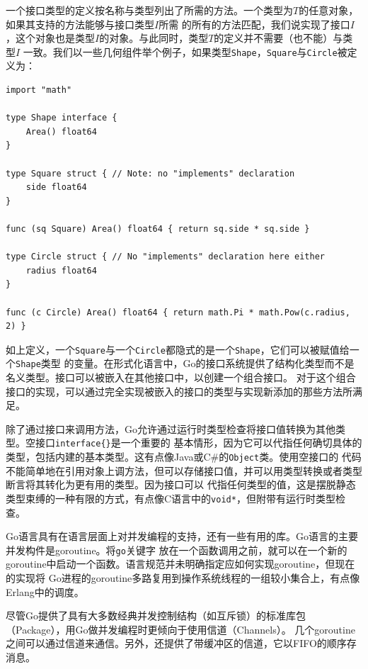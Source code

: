 \documentclass[12pt]{article}
\begin{document}
\indent{}一个接口类型的定义按名称与类型列出了所需的方法。一个类型为$T$的任意对象，如果其支持的方法能够与接口类型$I$所需
的所有的方法匹配，我们说实现了接口$I$，这个对象也是类型$I$的对象。与此同时，类型$T$的定义并不需要（也不能）与类型$I$
一致。我们以一些几何组件举个例子，如果类型\texttt{Shape}，\texttt{Square}与\texttt{Circle}被定义为：
\begin{verbatim}
import "math"

type Shape interface {
    Area() float64
}

type Square struct { // Note: no "implements" declaration
    side float64
}

func (sq Square) Area() float64 { return sq.side * sq.side }

type Circle struct { // No "implements" declaration here either
    radius float64
}

func (c Circle) Area() float64 { return math.Pi * math.Pow(c.radius, 2) }
\end{verbatim}
如上定义，一个\texttt{Square}与一个\texttt{Circle}都隐式的是一个\texttt{Shape}，它们可以被赋值给一个\texttt{Shape}类型
的变量。在形式化语言中，Go的接口系统提供了结构化类型而不是名义类型。接口可以被嵌入在其他接口中，以创建一个组合接口。
对于这个组合接口的实现，可以通过完全实现被嵌入的接口的类型与实现新添加的那些方法所满足。

\indent{}除了通过接口来调用方法，Go允许通过运行时类型检查将接口值转换为其他类型。空接口\texttt{interface\{\}}是一个重要的
基本情形，因为它可以代指任何确切具体的类型，包括内建的基本类型。这有点像Java或C\#的\texttt{Object}类。使用空接口的
代码不能简单地在引用对象上调方法，但可以存储接口值，并可以用类型转换或者类型断言将其转化为更有用的类型。因为接口可以
代指任何类型的值，这是摆脱静态类型束缚的一种有限的方式，有点像C语言中的\texttt{void*}，但附带有运行时类型检查。

\indent{}Go语言具有在语言层面上对并发编程的支持，还有一些有用的库。Go语言的主要并发构件是goroutine。将\texttt{go}关键字
放在一个函数调用之前，就可以在一个新的goroutine中启动一个函数。语言规范并未明确指定应如何实现goroutine，但现在的实现将
Go进程的goroutine多路复用到操作系统线程的一组较小集合上，有点像Erlang中的调度。

\indent{}尽管Go提供了具有大多数经典并发控制结构（如互斥锁）的标准库包（Package），用Go做并发编程时更倾向于使用信道（Channels）。
几个goroutine之间可以通过信道来通信。另外，还提供了带缓冲区的信道，它以FIFO的顺序存消息。
\end{document}
